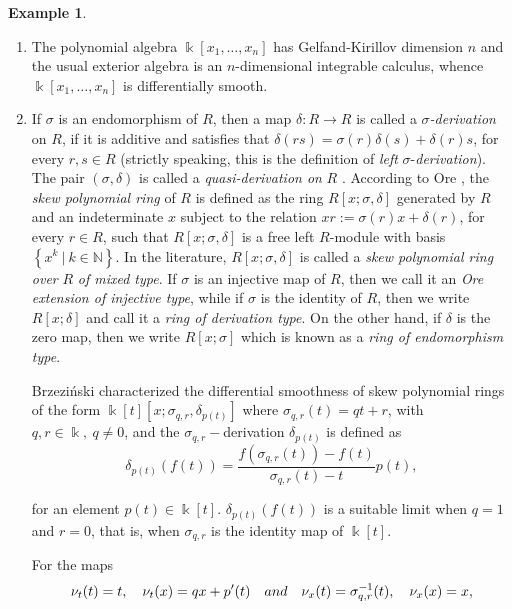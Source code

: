\documentclass{amsart}
\theoremstyle{definition}
\newtheorem{example}[theorem]{Example}
\theoremstyle{remark}
\numberwithin{equation}{section}
\begin{document}
\begin{example}\label{Brzezinski2015DSOEbiquadratic}
\begin{enumerate}
    \item [\rm (i)] The polynomial algebra $\Bbbk[x_1, \dotsc, x_n]$ has Gelfand-Kirillov dimension $n$ and the usual exterior algebra is an $n$-dimensional integrable calculus, whence $\Bbbk[x_1, \dotsc, x_n]$ is differentially smooth.

    \item [\rm (ii)] If $\sigma$ is an endomorphism of $R$, then a map $\delta : R \rightarrow R$ is called a {\em $\sigma$-derivation} on $R$, if it is additive and satisfies that $\displaystyle \delta(r s) = \sigma(r )\delta(s)+\delta(r )s$, for every $r,s \in R$ (strictly speaking, this is the definition of {\em left} $\sigma$-{\em derivation}). The pair $(\sigma, \delta)$ is called a {\em quasi-derivation on} $R$ \cite[Definition 3.1]{BuesoTorrecillasVerschoren2003}. According to Ore \cite{Ore1931, Ore1933}, the {\em skew polynomial ring} of $R$ is defined as the ring $R[x;\sigma,\delta]$ generated by $R$ and an indeterminate $x$ subject to the relation $xr := \sigma(r)x + \delta(r)$, for every $r \in R$, such that $R[x;\sigma,\delta]$ is a free left $R$-module with basis $\left \{x^k\ | \ k \in \mathbb{N} \right \}$. In the literature, $R[x;\sigma, \delta]$ is called a {\em skew polynomial ring over} $R$ {\em of mixed type}. If $\sigma$ is an injective map of $R$, then we call it an {\em Ore extension of injective type}, while if $\sigma$ is the identity of $R$, then we write $R[x;\delta]$ and call it a {\em ring of derivation type}. On the other hand, if $\delta$ is the zero map, then we write $R[x;\sigma]$ which is known as a {\em ring of endomorphism type}. 

Brzezi{\'n}ski \cite{Brzezinski2015} characterized the differential smoothness of skew polynomial rings of the form $\Bbbk[t][x; \sigma_{q, r}, \delta_{p(t)}]$ where $\sigma_{q, r}(t) = qt + r$, with $q, r \in \Bbbk,\ q\neq 0$, and the $\sigma_{q, r}-$derivation $\delta_{p(t)}$ is defined as
\begin{equation}\label{deltap}
\delta_{p(t)} (f(t)) = \frac{f(\sigma_{q, r}(t)) - f(t)}{\sigma_{q, r}(t) - t} p(t),
\end{equation}

for an element $p(t) \in \Bbbk[t]$. $\delta_{p(t)}(f(t))$ is a suitable limit when $q = 1$ and $r = 0$, that is, when $\sigma_{q, r}$ is the identity map of $\Bbbk[t]$.

For the maps
\begin{equation}\label{Brzezinski2015(3.4)}
\nu_t(t) = t,\quad \nu_t(x) = qx + p'(t)\quad {\rm and}\quad \nu_x(t) = \sigma_{q, r}^{-1}(t),\quad \nu_x(x) = x,
\end{equation}


\end{enumerate}
\end{example}
\end{document}
